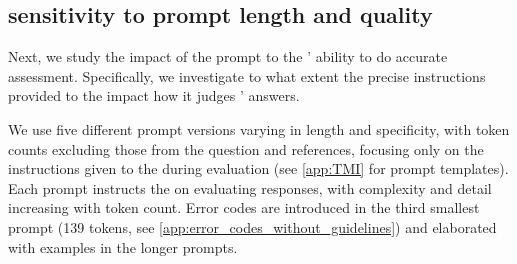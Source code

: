 

\subsection{\JudgeModel sensitivity to prompt length and quality}\label{sec:analysis:subsec:instructions}


Next, we study the impact of the prompt to the \judgemodels' ability to do accurate assessment.
Specifically, we investigate to what extent the precise instructions provided to the \judgemodel impact how it judges \evaluatormodels' answers.

We use five different prompt versions varying in length and specificity, with token counts excluding those from the question and references, focusing only on the instructions given to the \judgemodel during evaluation (see \cref{app:TMI} for prompt templates). Each prompt instructs the \judgemodels on evaluating responses, with complexity and detail increasing with token count. Error codes are introduced in the third smallest prompt (139 tokens, see \cref{app:error_codes_without_guidelines}) and elaborated with examples in the longer prompts.
% 

